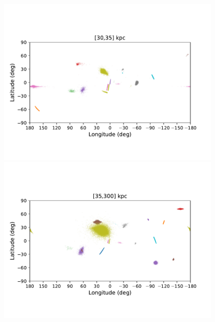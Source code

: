     \twocolumn
    \begin{figure}[h!]
        \begin{center}
            \includegraphics[clip=true, trim = 0mm 15mm 0mm 20mm, width=0.9\columnwidth]{images/PII_ensemble_LB_D30-35_scatter.pdf}
            \includegraphics[clip=true, trim = 0mm 15mm 0mm 20mm, width=0.9\columnwidth]{images/PII_ensemble_LB_D35-300_scatter.pdf}


\end{center}
\end{figure}
